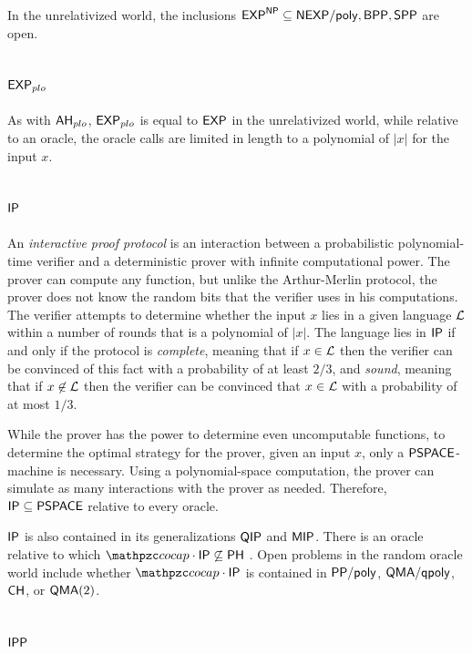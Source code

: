 In the unrelativized world, the inclusions 
$\mathsf{EXP}^{\mathsf{NP}}\subseteq\mathsf{NEXP}/\mathsf{poly},\mathsf{BPP},\mathsf{SPP}$ are open.

\subsection{$\mathsf{EXP}_{plo}$}

As with $\mathsf{AH}_{plo}$, $\mathsf{EXP}_{plo}$ is equal to $\mathsf{EXP}$ in the 
unrelativized world, while relative to an oracle, the oracle calls are limited 
in length to a polynomial of $|x|$ for the input $x$.

\subsection{$\mathsf{IP}$}

An \textit{interactive proof protocol} is an interaction between a probabilistic
polynomial-time verifier and a deterministic prover with infinite computational 
power. The prover can compute any function, but unlike the Arthur-Merlin 
protocol, the prover does not know the random bits that the verifier uses in his
computations. The verifier attempts to determine whether the input $x$ lies in a
given language $\mathcal{L}$ within a number of rounds that is a polynomial of $|x|$. 
The language lies in $\mathsf{IP}$ if and only if the protocol is 
\textit{complete}, meaning that if $x\in\mathcal{L}$ then the verifier can be convinced 
of this fact with a probability of at least $2/3$, and \textit{sound}, meaning 
that if $x\not\in\mathcal{L}$ then the verifier can be convinced that $x\in\mathcal{L}$ with a 
probability of at most $1/3$.

While the prover has the power to determine even uncomputable functions, to 
determine the optimal strategy for the prover, given an input $x$, only a 
$\mathsf{PSPACE}$-machine is necessary. Using a polynomial-space computation, the 
prover can simulate as many interactions with the prover as needed. Therefore, 
$\mathsf{IP}\subseteq\mathsf{PSPACE}$ relative to every oracle.

$\mathsf{IP}$ is also contained in its generalizations $\mathsf{QIP}$ and $\mathsf{MIP}$.
There is an oracle relative to which $\cocap\cdot\msf{IP}\not\subseteq\msf{PH}$ 
\cite{aiello1990power}. Open problems in the random oracle world include whether
$\cocap\cdot\msf{IP}$ is contained in $\mathsf{PP}/\mathsf{poly}$, $\mathsf{QMA}/\mathsf{qpoly}$,
$\mathsf{CH}$, or $\mathsf{QMA}(2)$.

\subsection{$\mathsf{IPP}$}

